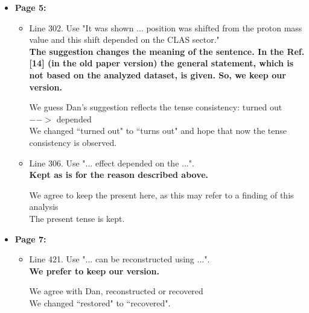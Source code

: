 \documentclass[superscriptaddress,showpacs,amssymb,amsmath,amsfonts,linenumbers,article]{revtex4-1}
\begin{document}
\begin{itemize}
\begin{itemize}
\end{itemize}

\item {\bf \large  Page 5:}

\begin{itemize} 


\item Line 302. Use "It was shown ... position was shifted from the proton mass value and this shift depended on the CLAS sector."\\
{\bf The suggestion changes the meaning of the sentence. In the Ref.[14] (in the old paper version) the general statement, which is not based on the analyzed dataset, is given. So, we keep our version.}

\vspace{1em}

{\color{red} We guess Dan's suggestion reflects the tense consistency: turned out $-->$ depended}\\ 
{\color{blue} We changed ``turned out" to ``turns out" and hope that now the tense consistency is observed. }


\item Line 306. Use "... effect depended on the ...".\\
{\bf Kept as is for the reason described above.} 

\vspace{1em}

{\color{red} We agree to keep the present here, as this may refer to a finding 		of this analysis}\\
{\color{blue} The present tense is kept.} 



\end{itemize}

 


\item {\bf \large  Page 7:}
\begin{itemize} 

\vspace{1em}

{\color{red} } 


\item Line 421. Use "... can be reconstructed using ...".\\
{\bf We prefer to keep our version.}

\vspace{1em}

{\color{red} We agree with Dan, reconstructed or recovered}\\
{\color{blue} We changed ``restored" to ``recovered".\\[0.5em]} 



\end{itemize}
\end{itemize}
\end{document}
